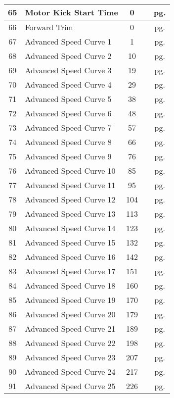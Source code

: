 \documentclass[12pt,letterpaper,draft]{memoir} %
\begin{document}
\begin{center}
\begin{longtable}{|c|l|c|c|c|}
65&Motor Kick Start Time&0&&pg. \pageref{CV65} \\ \hline
66&Forward Trim&0&&pg. \pageref{CV66} \\ \hline
67&Advanced Speed Curve 1&1&&pg. \pageref{CV67} \\ \hline
68&Advanced Speed Curve 2&10&&pg. \pageref{CV68} \\ \hline
69&Advanced Speed Curve 3&19&&pg. \pageref{CV69} \\ \hline
70&Advanced Speed Curve 4&29&&pg. \pageref{CV70} \\ \hline
71&Advanced Speed Curve 5&38&&pg. \pageref{CV71} \\ \hline
72&Advanced Speed Curve 6&48&&pg. \pageref{CV72} \\ \hline
73&Advanced Speed Curve 7&57&&pg. \pageref{CV73} \\ \hline
74&Advanced Speed Curve 8&66&&pg. \pageref{CV74} \\ \hline
75&Advanced Speed Curve 9&76&&pg. \pageref{CV75} \\ \hline
76&Advanced Speed Curve 10&85&&pg. \pageref{CV76} \\ \hline
77&Advanced Speed Curve 11&95&&pg. \pageref{CV77} \\ \hline
78&Advanced Speed Curve 12&104&&pg. \pageref{CV78} \\ \hline
79&Advanced Speed Curve 13&113&&pg. \pageref{CV79} \\ \hline
80&Advanced Speed Curve 14&123&&pg. \pageref{CV80} \\ \hline
81&Advanced Speed Curve 15&132&&pg. \pageref{CV81} \\ \hline
82&Advanced Speed Curve 16&142&&pg. \pageref{CV82} \\ \hline
83&Advanced Speed Curve 17&151&&pg. \pageref{CV83} \\ \hline
84&Advanced Speed Curve 18&160&&pg. \pageref{CV84} \\ \hline
85&Advanced Speed Curve 19&170&&pg. \pageref{CV85} \\ \hline
86&Advanced Speed Curve 20&179&&pg. \pageref{CV86} \\ \hline
87&Advanced Speed Curve 21&189&&pg. \pageref{CV87} \\ \hline
88&Advanced Speed Curve 22&198&&pg. \pageref{CV88} \\ \hline
89&Advanced Speed Curve 23&207&&pg. \pageref{CV89} \\ \hline
90&Advanced Speed Curve 24&217&&pg. \pageref{CV90} \\ \hline
91&Advanced Speed Curve 25&226&&pg. \pageref{CV91} \\ \hline

\end{longtable}
\end{center}
\end{document}
